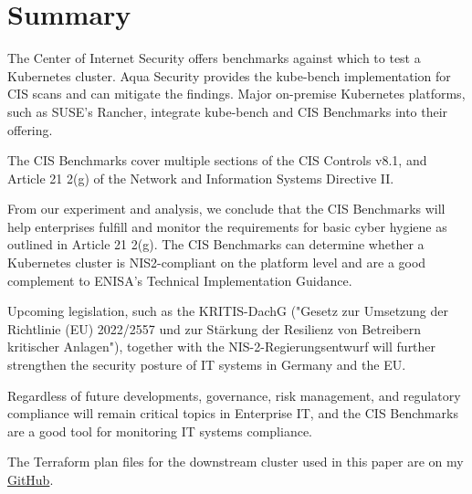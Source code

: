 %
%

\pagebreak
\section{Summary}

\onehalfspacing

The Center of Internet Security offers benchmarks against which to test a Kubernetes cluster. Aqua Security provides the kube-bench implementation for CIS scans and can mitigate the findings. Major on-premise Kubernetes platforms, such as SUSE's Rancher, integrate kube-bench and CIS Benchmarks into their offering.

The CIS Benchmarks cover multiple sections of the CIS Controls v8.1, and Article 21 2(g) of the Network and Information Systems Directive II.

From our experiment and analysis, we conclude that the CIS Benchmarks will help enterprises fulfill and monitor the requirements for basic cyber hygiene as outlined in Article 21 2(g). The CIS Benchmarks can determine whether a Kubernetes cluster is NIS2-compliant on the platform level and are a good complement to ENISA's Technical Implementation Guidance.

Upcoming legislation, such as the KRITIS-DachG ("Gesetz zur Umsetzung der Richtlinie (EU) 2022/2557 und zur Stärkung der Resilienz von Betreibern kritischer Anlagen"), together with the NIS-2-Regierungsentwurf will further strengthen the security posture of IT systems in Germany and the EU.

Regardless of future developments, governance, risk management, and regulatory compliance will remain critical topics in Enterprise IT, and the CIS Benchmarks are a good tool for monitoring IT systems compliance.

The Terraform plan files for the downstream cluster used in this paper are on my \href{https://github.com/chfrank-cgn/Rancher}{GitHub}.
